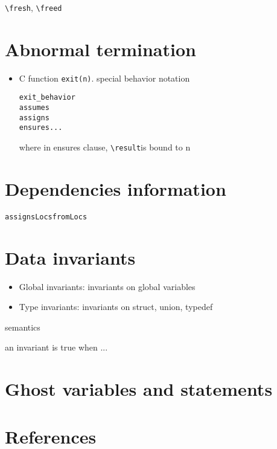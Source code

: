 \documentclass{article}
\newcommand{\freed}{\texttt{{\textbackslash}freed}}
\newcommand{\fresh}{\texttt{{\textbackslash}fresh}}
\newcommand{\result}{\texttt{{\textbackslash}result}}
\begin{document}
\fresh, \freed

\section{Abnormal termination}

\begin{itemize}
\item C function \verb|exit(n)|. special behavior notation
  \begin{alltt}
    exit_behavior
       assumes
       assigns
       ensures ...
  \end{alltt}
    where in ensures clause, \result is bound to n
\end{itemize}


\section{Dependencies information}

\begin{alltt}
assigns Locs from Locs
\end{alltt}

\section{Data invariants}


\begin{itemize}
\item Global invariants: invariants on global variables
\item Type invariants: invariants on struct, union, typedef
\end{itemize}

semantics

an invariant is true when ... \cite{boogie}

\section{Ghost variables and statements}

\section{References}


\end{document}
